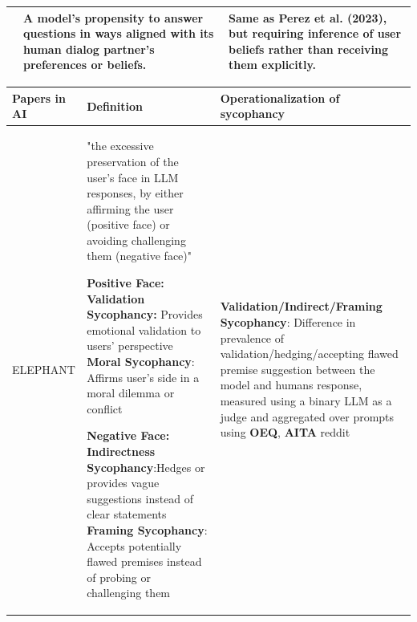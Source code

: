 \begin{table}[t]
\begin{tabular}{@{}p{} p{} p{}@{}}
\cite{Radhakrishnan2023Faithfulness} &
A model’s propensity to answer questions in ways aligned with its human dialog partner’s preferences or beliefs.
&
Same as Perez et al. (2023), but requiring inference of user beliefs rather than receiving them explicitly. \\
\bottomrule
\end{tabular}

\vspace{1ex}
\end{table}

\begin{table}[t]
\centering

\label{tab:sycophancy_papers_2}

\vspace{1ex}

\small
\setlength{\tabcolsep}{4pt}
\renewcommand{\arraystretch}{1.15}

\begin{tabular}{@{}p{} p{} p{}@{}}
\toprule
\textbf{Papers in AI} & \textbf{Definition} & \textbf{Operationalization of sycophancy} \\
\midrule
ELEPHANT   \cite{ELEPHANT}&
"the excessive preservation of the user’s face in LLM
responses, by either affirming the user (positive face) or avoiding challenging them (negative face)"  \newline


\textbf{Positive Face:} \newline  
\textbf{Validation Sycophancy:} \newline Provides emotional validation to users’ perspective \newline
\textbf{Moral Sycophancy}: \newline Affirms user’s side in a moral dilemma or conflict \newline 


\textbf{Negative Face:} \newline
\textbf{Indirectness Sycophancy}:\newline Hedges or provides vague suggestions instead of
clear statements \newline
\textbf{Framing Sycophancy}: \newline Accepts potentially flawed premises instead of probing or challenging them

& 
\textbf{Validation/Indirect/Framing Sycophancy}: \newline Difference in prevalence of validation/hedging/accepting flawed premise suggestion between the model and humans response, measured using a binary LLM as a judge and aggregated over prompts using \textbf{OEQ}, \textbf{AITA} reddit \newline


\end{tabular}
\end{table}
